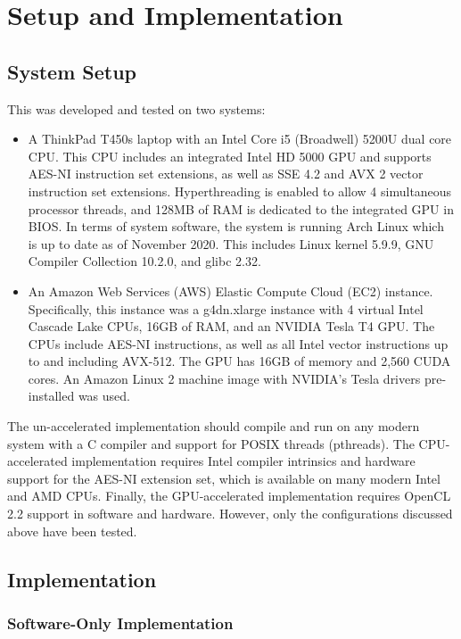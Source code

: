 \documentclass[a4paper,10pt]{article}
\begin{document}
\section{Setup and Implementation}
 
\subsection{System Setup}

This was developed and tested on two systems:
\begin{itemize}
\item{A ThinkPad T450s laptop with an Intel Core i5 (Broadwell) 5200U dual core CPU.  This CPU includes an integrated Intel HD 5000 GPU and supports AES-NI instruction set extensions, as well as SSE 4.2 and AVX 2 vector instruction set extensions.  Hyperthreading is enabled to allow 4 simultaneous processor threads, and 128MB of RAM is dedicated to the integrated GPU in BIOS.  In terms of system software, the system is running Arch Linux which is up to date as of November 2020.  This includes Linux kernel 5.9.9, GNU Compiler Collection 10.2.0, and glibc 2.32.}

\item{An Amazon Web Services (AWS) Elastic Compute Cloud (EC2) instance.  Specifically, this instance was a g4dn.xlarge instance with 4 virtual Intel Cascade Lake CPUs, 16GB of RAM, and an NVIDIA Tesla T4 GPU.  The CPUs include AES-NI instructions, as well as all Intel vector instructions up to and including AVX-512.  The GPU has 16GB of memory and 2,560 CUDA cores.  An Amazon Linux 2 machine image with NVIDIA's Tesla drivers pre-installed was used.}
\end{itemize}

The un-accelerated implementation should compile and run on any modern system with a C compiler and support for POSIX threads (pthreads).  The CPU-accelerated implementation requires Intel compiler intrinsics and hardware support for the AES-NI extension set, which is available on many modern Intel and AMD CPUs.  Finally, the GPU-accelerated implementation requires OpenCL 2.2 support in software and hardware.  However, only the configurations discussed above have been tested.

\subsection{Implementation}

\subsubsection{Software-Only Implementation}
\end{document}
